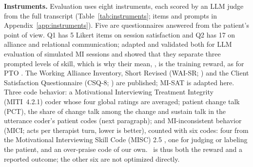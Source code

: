 \textbf{Instruments.} Evaluation uses eight instruments, each scored by an LLM judge from
the full transcript (Table~\ref{tab:instruments}; items and prompts in
Appendix~\ref{app:instruments}).
Five are questionnaires answered from the patient's point of view. Q1 has 5 Likert items on session
satisfaction and Q2 has 17 on alliance and relational communication; \citet{yosef2024assessing}
adapted and validated both for LLM evaluation of simulated MI sessions and showed that they separate
three prompted levels of skill, which is why their mean, \QQ, is the training reward, as for PTO
\citep{baruch2025pto}. The Working Alliance Inventory, Short
Revised (WAI-SR; \citealp{hatcher2006waisr}) and the Client Satisfaction Questionnaire (CSQ-8;
\citealp{larsen1979csq}) are published; MI-SAT is adapted here. Three code behavior:
a Motivational Interviewing Treatment Integrity (MITI~4.2.1) coder
\citep{moyers2016miti,moyers2016miti4} whose four global ratings are averaged; patient change talk
(PCT), the share of change talk among the change and sustain talk in the utterance coder's patient
codes (next paragraph); and MI-inconsistent behavior (MICI; acts per therapist turn, lower is
better), counted with six codes: four from the Motivational Interviewing Skill Code (MISC) 2.5
\citep{houck2010misc}, one for judging or labeling the patient, and an over-praise code of our own. \QQ\ is thus both the
reward and a reported outcome; the other six are not optimized directly.

